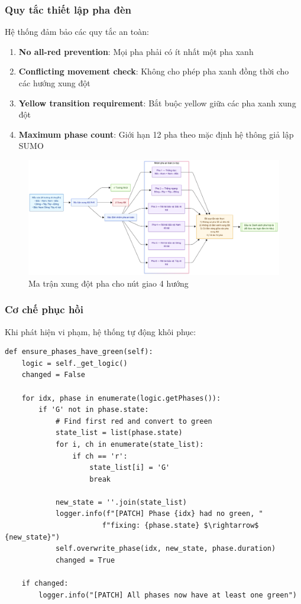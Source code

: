 \documentclass[12pt,a4paper,oneside]{report}
\begin{document}
\subsubsection{Quy tắc thiết lập pha đèn}

Hệ thống đảm bảo các quy tắc an toàn:

\begin{enumerate}
    \item \textbf{No all-red prevention}: Mọi pha phải có ít nhất một pha xanh
    \item \textbf{Conflicting movement check}: Không cho phép pha xanh đồng thời cho các hướng xung đột
    \item \textbf{Yellow transition requirement}: Bắt buộc yellow giữa các pha xanh xung đột
    \item \textbf{Maximum phase count}: Giới hạn 12 pha theo mặc định hệ thông giả lập SUMO
\end{enumerate}

\begin{figure}[htbp]
    \centering
    \includegraphics[width=1.0\linewidth]{Untitled diagram _ Mermaid Chart-2025-08-22-074409.png}
    \caption{Ma trận xung đột pha cho nút giao 4 hướng}
    \label{fig:conflict_matrix}
\end{figure}
\subsubsection{Cơ chế phục hồi}

Khi phát hiện vi phạm, hệ thống tự động khôi phục:

\begin{lstlisting}[style=py, caption={Automatic conflict resolution}]
def ensure_phases_have_green(self):
    logic = self._get_logic()
    changed = False
    
    for idx, phase in enumerate(logic.getPhases()):
        if 'G' not in phase.state:
            # Find first red and convert to green
            state_list = list(phase.state)
            for i, ch in enumerate(state_list):
                if ch == 'r':
                    state_list[i] = 'G'
                    break
                    
            new_state = ''.join(state_list)
            logger.info(f"[PATCH] Phase {idx} had no green, "
                       f"fixing: {phase.state} $\rightarrow$ {new_state}")
            self.overwrite_phase(idx, new_state, phase.duration)
            changed = True
            
    if changed:
        logger.info("[PATCH] All phases now have at least one green")
\end{lstlisting}
\end{document}

